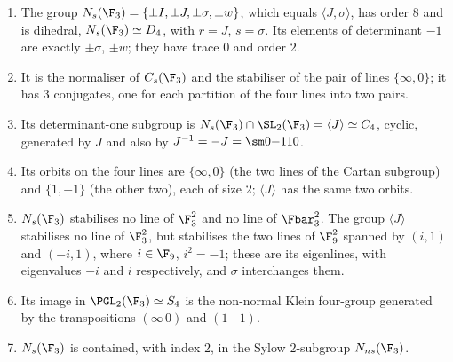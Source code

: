 \begin{proposition}\label{prop:groups:ns3}
\begin{enumerate}[label=(\roman*)]
\item The group $N_s(\F_3)=\{\pm I,\pm J,\pm\sigma,\pm w\}$, which equals $\langle J,\sigma\rangle$, has order $8$ and is dihedral, $N_s(\F_3)\simeq D_4$, with $r=J$, $s=\sigma$. Its elements of
determinant $-1$ are exactly $\pm\sigma$, $\pm w$; they have trace $0$ and order $2$.
\item It is the normaliser of $C_s(\F_3)$ and the stabiliser of the pair of lines $\{\infty,0\}$; it has $3$ conjugates, one for each partition of the four lines into
two pairs.
\item Its determinant-one subgroup is $N_s(\F_3)\cap\SL_2(\F_3)=\langle J\rangle\simeq C_4$, cyclic, generated by $J$ and also by $J^{-1}=-J=\sm0{-1}10$.
\item Its orbits on the four lines are $\{\infty,0\}$ (the two lines of the Cartan subgroup) and $\{1,-1\}$ (the other two), each of size $2$; $\langle J\rangle$ has
the same two orbits.
\item $N_s(\F_3)$ stabilises no line of $\F_3^2$ and no line of $\Fbar_3^2$. The group $\langle J\rangle$ stabilises no line of $\F_3^2$, but stabilises the two lines of
$\F_9^2$ spanned by $(i,1)$ and $(-i,1)$, where $i\in\F_9$, $i^2=-1$; these are its eigenlines, with eigenvalues $-i$ and $i$ respectively, and $\sigma$ interchanges them.
\item Its image in $\PGL_2(\F_3)\simeq S_4$ is the non-normal Klein four-group generated by the transpositions $(\infty\,0)$ and $(1\,{-1})$.
\item $N_s(\F_3)$ is contained, with index $2$, in the Sylow $2$-subgroup $N_{ns}(\F_3)$.
\end{enumerate}
\end{proposition}


